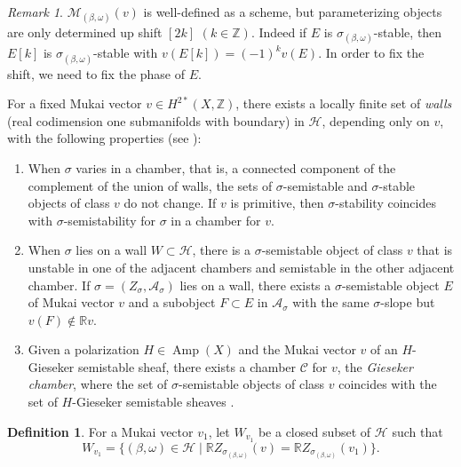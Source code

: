 \documentclass[10pt]{amsart}
\def\cal{\mathcal}
\def\Bbb{\mathbb}
\newcommand{\Amp}{\operatorname{Amp}}
\numberwithin{equation}{section}
\theoremstyle{plain}
\theoremstyle{definition}
\newtheorem{defn}[thm]{Definition}
\theoremstyle{remark}
\newtheorem{rem}[thm]{Remark}
\begin{document}
\begin{rem}\label{rem:moduli}
${\cal M}_{(\beta,\omega)}(v)$ is well-defined as a scheme, but parameterizing
objects are only determined up shift $[2k]$ $(k \in {\Bbb Z})$.
Indeed if $E$ is $\sigma_{(\beta,\omega)}$-stable, then
$E[k]$ is $\sigma_{(\beta,\omega)}$-stable with $v(E[k])=(-1)^k v(E)$.
In order to fix the shift, we need to fix the phase of $E$.
\end{rem}



For a fixed Mukai vector $v \in H^{2*}(X,{\Bbb Z})$, there exists a locally finite set of \emph{walls} (real codimension one submanifolds with boundary) in ${\cal H}$, 
depending only on $v$, with the following properties (see \cite{Br:3}):
\begin{enumerate}
\item[(1)]
When $\sigma$ varies in a chamber, that is, a connected component of 
the complement of the union of walls, the sets of 
$\sigma$-semistable and $\sigma$-stable objects of class $v$ do not change. 
If $v$ is primitive, then $\sigma$-stability coincides with $\sigma$-semistability 
for $\sigma$ in a chamber for $v$.

\item[(2)]
 When $\sigma$ lies on a wall $W \subset {\cal H}$, 
there is a $\sigma$-semistable object of class $v$ that is unstable in one of the adjacent chambers 
and semistable in the other adjacent chamber.
 If $\sigma= (Z_\sigma, {\cal A}_\sigma)$ lies on a wall, there exists a $\sigma$-semistable object $E$ 
of Mukai vector $v$ and a subobject $F \subset E$ in ${\cal A}_\sigma$ 
with the same $\sigma$-slope but 
$v(F) \not \in {\Bbb R} v$.

\item[(3)]
 Given a polarization $H\in\Amp(X)$ and the Mukai vector $v$ of an $H$-Gieseker semistable sheaf, 
there exists a chamber ${\cal C}$ for $v$, the \emph{Gieseker chamber}, 
where the set of $\sigma$-semistable objects of class 
$v$ coincides with the set of $H$-Gieseker semistable sheaves \cite[Prop. 14.2]{Br:3}.
\end{enumerate}

\begin{defn}\label{defn:W}
For a Mukai vector $v_1$,
let $W_{v_1}$ be a closed subset of ${\cal H}$ such that
$$
W_{v_1}=\{(\beta,\omega) \in {\cal H} \mid {\Bbb R} Z_{\sigma_{(\beta,\omega)}}(v)=
 {\Bbb R}Z_{\sigma_{(\beta,\omega)}}(v_1) \}.
$$
\end{defn}
\end{document}
